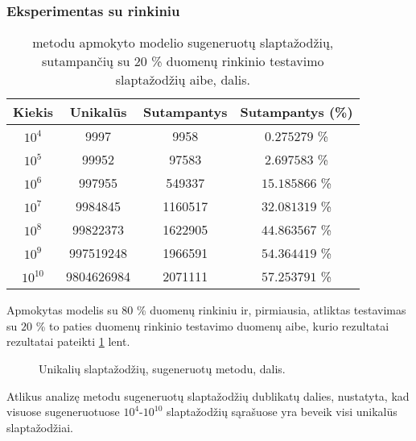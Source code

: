 \documentclass{VUMIFInfBakalaurinis}
\begin{document}
\subsubsection{Eksperimentas su  rinkiniu} %
\label{sec:pgpcfg}
\begin{table}[hb]
  \centering
  \caption{%
     metodu apmokyto modelio sugeneruotų slaptažodžių, 
    sutampančių su $20$ \%  duomenų rinkinio testavimo
    slaptažodžių aibe, dalis.
  }
  \begin{tabular}{|c|c|c|c|}
    \hline \textbf{Kiekis} & \textbf{Unikalūs} & \textbf{Sutampantys} & 
    \textbf{Sutampantys (\%)} \\
    \hline $10^4$ & 9997 & 9958 & $0.275279$ \% \\
    \hline $10^5$ & 99952 & 97583 & $2.697583$ \% \\
    \hline $10^6$ & 997955 & 549337 & $15.185866$ \% \\
    \hline $10^7$ & 9984845 & 1160517 & $32.081319$ \% \\
    \hline $10^8$ & 99822373 & 1622905 & $44.863567$ \% \\
    \hline $10^9$ & 997519248 & 1966591 & $54.364419$ \% \\
    \hline $10^{10}$ & 9804626984 & 2071111 & $57.253791$ \% \\
    \hline
  \end{tabular}
  \label{tab:pcfg-rockyou-results}
\end{table}
Apmokytas modelis su $80$ \%  duomenų rinkiniu ir, 
pirmiausia, atliktas testavimas su $20$ \% to paties duomenų rinkinio testavimo 
duomenų aibe, kurio rezultatai rezultatai pateikti 
\ref{tab:pcfg-rockyou-results} lent.

\begin{figure}[!ht]
  \begin{center}
  \end{center}
  \caption{%
    Unikalių slaptažodžių, sugeneruotų  metodu, dalis.
  }
  \label{plot:pcfg-rockyou-duplicates}
\end{figure}
Atlikus analizę  metodu sugeneruotų slaptažodžių dublikatų 
dalies, nustatyta, kad visuose sugeneruotuose $10^4$-$10^{10}$ slaptažodžių 
sąrašuose yra beveik visi unikalūs slaptažodžiai.
\end{document}
